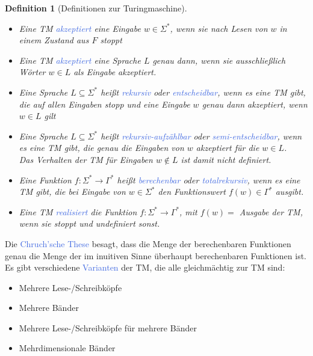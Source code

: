 \documentclass[11pt]{article}
\newcommand{\tcol}[1]{\textcolor{RoyalBlue}{#1}}
\theoremstyle{break}
\newtheorem{defi}[satz]{Definition}
\begin{document}
    \begin{defi}[Definitionen zur Turingmaschine]
        \begin{itemize}
            \item Eine TM \tcol{akzeptiert} eine Eingabe $w\in\Sigma^*$, wenn sie nach Lesen von $w$ in einem Zustand aus $F$ stoppt
            \item Eine TM \tcol{akzeptiert} eine Sprache $L$ genau dann, wenn sie ausschließlich Wörter $w\in L$ als Eingabe akzeptiert.
            \item Eine Sprache $L\subseteq\Sigma^*$ heißt \tcol{rekursiv} oder \tcol{entscheidbar}, wenn es eine TM gibt, die auf allen Eingaben stopp und eine Eingabe $w$ genau dann akzeptiert, wenn $w\in L$ gilt
            \item Eine Sprache $L\subseteq\Sigma^*$ heißt \tcol{rekursiv-aufzählbar} oder \tcol{semi-entscheidbar}, wenn es eine TM gibt, die genau die Eingaben von $w$ akzeptiert für die $w\in L$.\\
            Das Verhalten der TM für Eingaben $w\notin L$ ist damit nicht definiert.
            \item Eine Funktion $f\colon\Sigma^*\to\Gamma^*$ heißt \tcol{berechenbar} oder \tcol{totalrekursiv}, wenn es eine TM gibt, die bei Eingabe von $w\in\Sigma^*$ den Funktionswert $f(w)\in\Gamma^*$ ausgibt.
            \item Eine TM \tcol{realisiert} die Funktion $f\colon\Sigma^*\to\Gamma^*$, mit $f(w)=$ Ausgabe der TM, wenn sie stoppt und undefiniert sonst.
        \end{itemize}
    \end{defi}

    Die \tcol{Chruch'sche These} besagt, dass die Menge der berechenbaren Funktionen genau die Menge der im inuitiven Sinne überhaupt berechenbaren Funktionen ist.\\

    Es gibt verschiedene \tcol{Varianten} der TM, die alle gleichmächtig zur TM sind:
    \begin{itemize}
        \item Mehrere Lese-/Schreibköpfe
        \item Mehrere Bänder
        \item Mehrere Lese-/Schreibköpfe für mehrere Bänder
        \item Mehrdimensionale Bänder
    \end{itemize}
\end{document}

